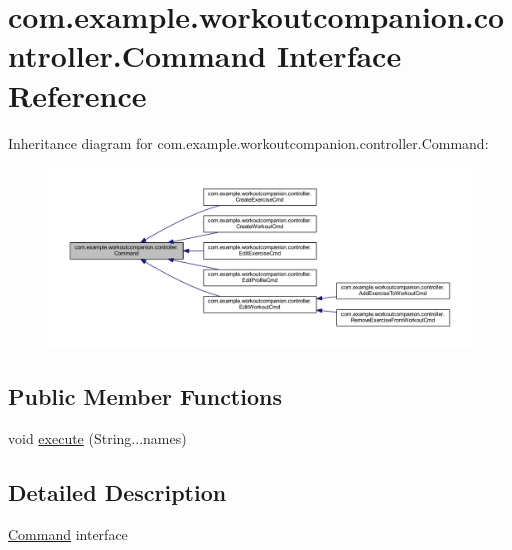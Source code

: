 \hypertarget{interfacecom_1_1example_1_1workoutcompanion_1_1controller_1_1_command}{\section{com.\-example.\-workoutcompanion.\-controller.\-Command Interface Reference}
\label{interfacecom_1_1example_1_1workoutcompanion_1_1controller_1_1_command}
}


Inheritance diagram for com.\-example.\-workoutcompanion.\-controller.\-Command\-:
\nopagebreak
\begin{figure}[H]
\begin{center}
\leavevmode
\includegraphics[width=350pt]{interfacecom_1_1example_1_1workoutcompanion_1_1controller_1_1_command__inherit__graph}
\end{center}
\end{figure}
\subsection*{Public Member Functions}
\begin{DoxyCompactItemize}
\item 
void \hyperlink{interfacecom_1_1example_1_1workoutcompanion_1_1controller_1_1_command_ad947864c82a300557eed99dd8367c020}{execute} (String...\-names)
\end{DoxyCompactItemize}


\subsection{Detailed Description}
\hyperlink{interfacecom_1_1example_1_1workoutcompanion_1_1controller_1_1_command}{Command} interface 

